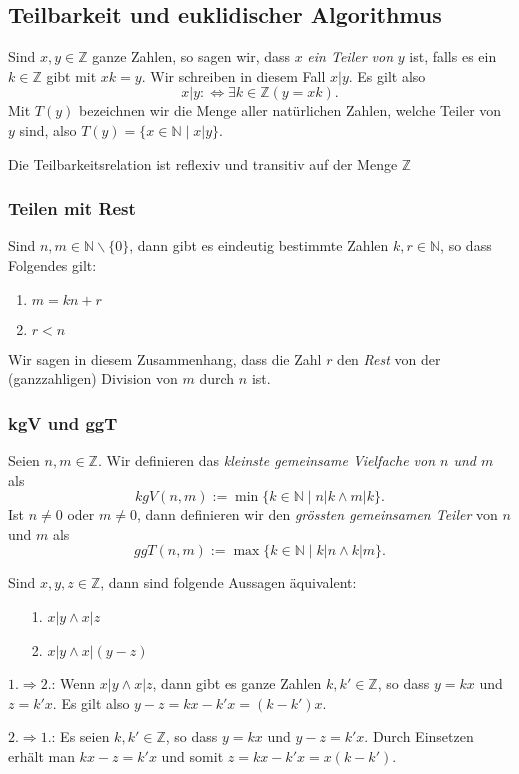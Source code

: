 \subsection{Teilbarkeit und euklidischer Algorithmus}
Sind $x,y\in\mathbb{Z}$ ganze Zahlen, so sagen wir, dass $x$ \textit{ein Teiler von} $y$ ist, falls es ein $k\in\mathbb{Z}$ gibt mit $xk=y$. Wir schreiben in diesem Fall $x|y$. Es gilt also
\[
	x|y:\Leftrightarrow \exists k\in\mathbb{Z}(y=xk).
\]
Mit $T(y)$ bezeichnen wir die Menge aller natürlichen Zahlen, welche Teiler von $y$ sind, also $T(y)=\{x\in\mathbb{N}\mid x|y\}$.

Die Teilbarkeitsrelation ist reflexiv und transitiv auf der Menge $\mathbb{Z}$

\subsubsection{Teilen mit Rest}
Sind $n,m\in\mathbb{N}\backslash\{0\}$, dann gibt es eindeutig bestimmte Zahlen $k,r\in\mathbb{N}$, so dass Folgendes gilt:
\begin{enumerate}
	\item $m=kn+r$
	\item $r<n$
\end{enumerate}
Wir sagen in diesem Zusammenhang, dass die Zahl $r$ den \textit{Rest} von der (ganzzahligen) Division von $m$ durch $n$ ist.

\subsubsection{kgV und ggT}
Seien $n,m\in\mathbb{Z}$. Wir definieren das \textit{kleinste gemeinsame Vielfache von $n$ und $m$} als
\[
	kgV(n,m):=\min\{k\in\mathbb{N}\mid n|k\wedge m|k\}.
\]
Ist $n\neq0$ oder $ m\neq 0$, dann definieren wir den \textit{grössten gemeinsamen Teiler} von $n$ und $m$ als
\[
	ggT(n,m):=\max\{k\in\mathbb{N}\mid k|n\wedge k|m\}.
\]

Sind $x,y,z\in\mathbb{Z}$, dann sind folgende Aussagen äquivalent:
\begin{enumerate}
	\item[1.] $ x|y\wedge x|z$
	\item[2.] $x|y\wedge x|(y-z) $
\end{enumerate}

$1.\Rightarrow 2.$: Wenn $x|y\wedge x|z$, dann gibt es ganze Zahlen $k,k'\in\mathbb{Z}$, so dass $y=kx$ und $z=k'x$. Es gilt also $y-z=kx-k'x=(k-k')x$.

$2.\Rightarrow 1.$: Es seien $k,k'\in\mathbb{Z}$, so dass $y=kx$ und $y-z=k'x$. Durch Einsetzen erhält man $ kx-z=k'x $ und somit $z=kx-k'x=x(k-k')$.

